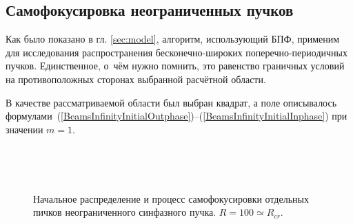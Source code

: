 \subsection{Самофокусировка неограниченных пучков}

Как было показано в гл. \ref{sec:model}, алгоритм, использующий БПФ, применим для исследования
распространения бесконечно-широких поперечно-периодичных пучков. Единственное, о~чём нужно помнить,
это равенство граничных условий на противоположных сторонах выбранной расчётной области.


В качестве рассматриваемой области был выбран квадрат, а поле описывалось
формулами~(\ref{BeamsInfinityInitialOutphase})--(\ref{BeamsInfinityInitialInphase}) при значении $m = 1$.


\begin{figure}[H]
    \begin{center}
        \begin{minipage}{\minipagewidththree}
        \end{minipage}
        \hspace{\minipagewidthpadding}
        \begin{minipage}{\minipagewidththree}
        \end{minipage}
        \\
        \begin{minipage}{\minipagewidththree}
        \end{minipage}
        \hspace{\minipagewidthpadding}
        \begin{minipage}{\minipagewidththree}
        \end{minipage}
        \\[1ex]
        \caption{Начальное распределение и процесс самофокусировки отдельных пичков неограниченного синфазного пучка. $R = 100 \simeq R_{cr}$.}
        \label{fig:BeamsInfinityOutphase}
    \end{center}
\end{figure}

